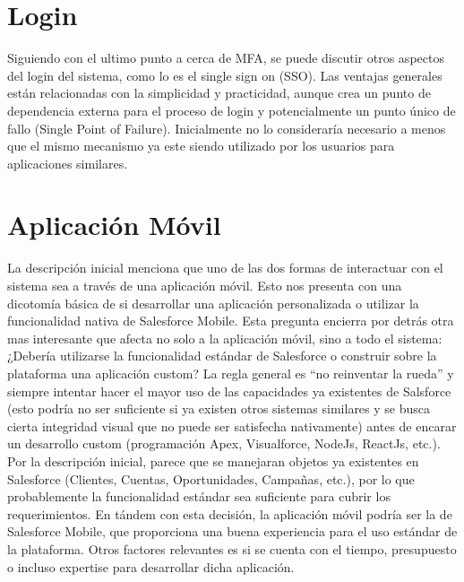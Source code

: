 \documentclass{article}
\begin{document}
\section{Login}

Siguiendo con el ultimo punto a cerca de MFA, se puede discutir otros aspectos del login del sistema, como lo es el single sign on (SSO). Las ventajas generales están relacionadas con la simplicidad y practicidad, aunque crea un punto de dependencia externa para el proceso de login y potencialmente un punto único de fallo (Single Point of Failure). Inicialmente no lo consideraría necesario a menos que el mismo mecanismo ya este siendo utilizado por los usuarios para aplicaciones similares.


\section{Aplicación Móvil}

La descripción inicial menciona que uno de las dos formas de interactuar con el sistema sea a través de una aplicación móvil. 
\newline \newline
Esto nos presenta con una dicotomía básica de si desarrollar una aplicación  personalizada o utilizar la funcionalidad nativa de Salesforce Mobile. Esta pregunta encierra por detrás otra mas interesante que afecta no solo a la aplicación móvil, sino a todo el sistema: ¿Debería utilizarse la funcionalidad estándar de Salesforce o construir sobre la plataforma una aplicación custom?
\newline \newline
La regla general es ``no reinventar la rueda'' y siempre intentar hacer el mayor uso de las capacidades ya existentes de Salsforce (esto podría no ser suficiente si ya existen otros sistemas similares y se busca cierta integridad visual que no puede ser satisfecha nativamente) antes de encarar un desarrollo custom (programación Apex, Visualforce, NodeJs, ReactJs, etc.).
\newline \newline
Por la descripción inicial, parece que se manejaran objetos ya existentes en Salesforce (Clientes, Cuentas, Oportunidades, Campañas, etc.), por lo que probablemente la funcionalidad estándar sea suficiente para cubrir los requerimientos. 
\newline
En tándem con esta decisión, la aplicación móvil podría ser la de Salesforce Mobile, que proporciona una buena experiencia para el uso estándar de la plataforma. Otros factores relevantes es si se cuenta con el tiempo, presupuesto o incluso expertise para desarrollar dicha aplicación.
\end{document}
